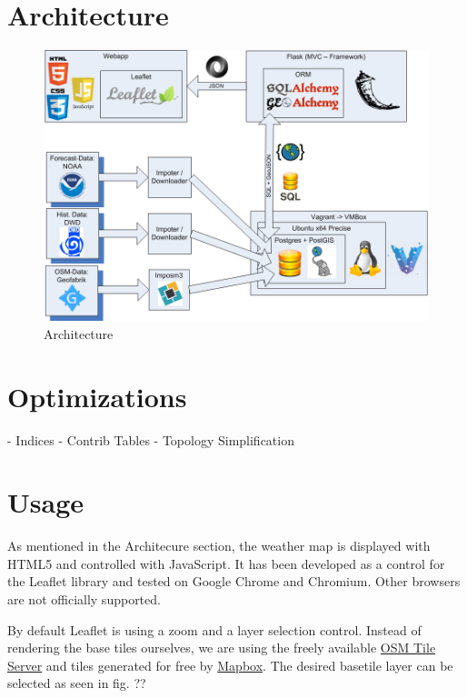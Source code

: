 \documentclass[paper=a4, fontsize=11pt]{scrartcl} %
\numberwithin{equation}{section} %
\numberwithin{figure}{section} %
\numberwithin{table}{section} %
\begin{document}
\section{Architecture}
\begin{figure}[htbp]
\includegraphics[width=1.1\textwidth]{pictures/Architektur.png}
\caption{Architecture}
\end{figure}

\section{Optimizations}
	- Indices
	- Contrib Tables
	- Topology Simplification
\section{Usage}\label{usage}

As mentioned in the Architecure section, the weather map is displayed
with HTML5 and controlled with JavaScript. It has been developed as a
control for the Leaflet library and tested on Google Chrome and
Chromium. Other browsers are not officially supported.

By default Leaflet is using a zoom and a layer selection control.
Instead of rendering the base tiles ourselves, we are using the freely
available
\href{http://wiki.openstreetmap.org/wiki/Tile_usage_policy}{OSM Tile
Server} and tiles generated for free by
\href{https://www.mapbox.com/}{Mapbox}. The desired basetile layer can
be selected as seen in fig. ??
\end{document}
